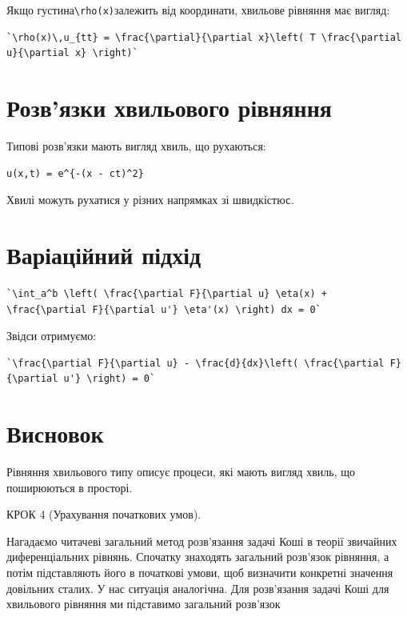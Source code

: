 \documentclass[
  ukrainian,
]{article}
\begin{document}
Якщо густина\texttt{\textbackslash{}rho(x)}залежить від координати,
хвильове рівняння має вигляд:

\begin{verbatim}
`\rho(x)\,u_{tt} = \frac{\partial}{\partial x}\left( T \frac{\partial u}{\partial x} \right)`
\end{verbatim}

\section{Розв'язки хвильового
рівняння}\label{ux440ux43eux437ux432ux44fux437ux43aux438-ux445ux432ux438ux43bux44cux43eux432ux43eux433ux43e-ux440ux456ux432ux43dux44fux43dux43dux44f}

Типові розв'язки мають вигляд хвиль, що рухаються:

\begin{verbatim}
u(x,t) = e^{-(x - ct)^2}
\end{verbatim}

Хвилі можуть рухатися у різних напрямках зі швидкістю\texttt{c}.

\section{Варіаційний
підхід}\label{ux432ux430ux440ux456ux430ux446ux456ux439ux43dux438ux439-ux43fux456ux434ux445ux456ux434}

\begin{verbatim}
`\int_a^b \left( \frac{\partial F}{\partial u} \eta(x) + \frac{\partial F}{\partial u'} \eta'(x) \right) dx = 0`
\end{verbatim}

Звідси отримуємо:

\begin{verbatim}
`\frac{\partial F}{\partial u} - \frac{d}{dx}\left( \frac{\partial F}{\partial u'} \right) = 0`
\end{verbatim}

\section{Висновок}\label{ux432ux438ux441ux43dux43eux432ux43eux43a-1}

Рівняння хвильового типу описує процеси, які мають вигляд хвиль, що
поширюються в просторі.

КРОК 4 (Урахування початкових умов).

Нагадаємо читачеві загальний метод розв'язання задачі Коші в теорії
звичайних диференціальних рівнянь. Спочатку знаходять загальний
розв'язок рівняння, а потім підставляють його в початкові умови, щоб
визначити конкретні значення довільних сталих. У нас ситуація
аналогічна. Для розв'язання задачі Коші для хвильового рівняння ми
підставимо загальний розв'язок
\end{document}
